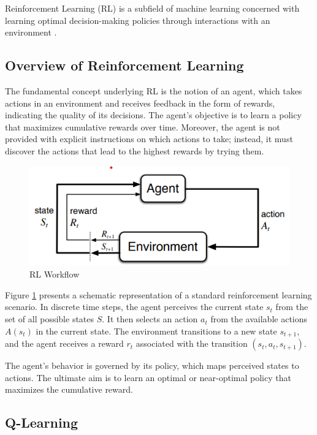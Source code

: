 Reinforcement Learning (RL) is a subfield of machine learning concerned with learning optimal decision-making policies through interactions with an environment \cite{sutton2018reinforcement}. 

\subsection{Overview of Reinforcement Learning}
The fundamental concept underlying RL is the notion of an agent, which takes actions in an environment and receives feedback in the form of rewards, indicating the quality of its decisions. The agent's objective is to learn a policy that maximizes cumulative rewards over time. Moreover, the agent is not provided with explicit instructions on which actions to take; instead, it must discover the actions that lead to the highest rewards by trying them.

\begin{figure}[ht]
    \centering
    \includegraphics[scale=1]{images/rl-workflow.png}
    \caption{RL Workflow}
    \label{fig:sutton_rl_workflow}
\end{figure}

Figure \ref{fig:sutton_rl_workflow} presents a schematic representation of a standard reinforcement learning scenario. In discrete time steps, the agent perceives the current state $s_t$ from the set of all possible states $S$. It then selects an action $a_t$ from the available actions $A(s_t)$ in the current state. The environment transitions to a new state $s_{t+1}$, and the agent receives a reward $r_t$ associated with the transition $(s_t, a_t, s_{t+1})$.

The agent's behavior is governed by its policy, which maps perceived states to actions. The ultimate aim is to learn an optimal or near-optimal policy that maximizes the cumulative reward. 


\subsection{Q-Learning}


